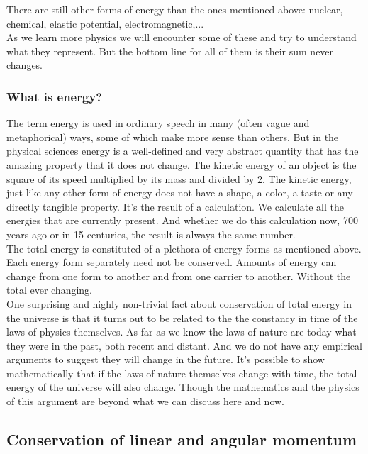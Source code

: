 \noindent There are still other forms of energy than the ones mentioned above: nuclear, chemical, elastic potential, electromagnetic,...\\
As we learn more physics we will encounter some of these and try to understand what they represent. But the bottom line for all of them is their sum never changes.

\subsubsection{What is energy?}

\noindent The term energy is used in ordinary speech in many (often vague and metaphorical) ways, some of which make more sense than others. But in the physical sciences energy is a well-defined and very abstract quantity that has the amazing property that it does not change. The kinetic energy of an object is the square of its speed multiplied by its mass and divided by 2. The kinetic energy, just like any other form of energy does not have a shape, a color, a taste or any directly tangible property. It's the result of a calculation. We calculate all the energies that are currently present. And whether we do this calculation now, 700 years ago or in 15 centuries, the result  is always the same number.\\

\noindent The total energy is constituted of a plethora of energy forms as mentioned above. Each energy form separately need not be conserved. Amounts of energy can change from one form to another and from one carrier to another. Without the total ever changing.\\

\noindent One surprising and highly non-trivial fact about conservation of total energy in the universe is that it turns out to be related to the the constancy in time of the laws of physics themselves. As far as we know the laws of nature are today what they were in the past, both recent and distant. And we do not have any empirical arguments to suggest they will change in the future. It's possible to show mathematically that if the laws of nature themselves change with time, the total energy of the universe will also change. Though the mathematics and the physics of this argument are beyond what we can discuss here and now.

\subsection{Conservation of linear and angular momentum}

